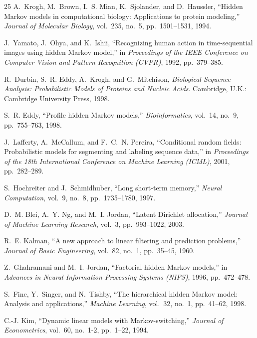 \documentclass[conference]{IEEEtran}
\begin{document}
\begin{thebibliography}{25}
A.~Krogh, M.~Brown, I.~S. Mian, K.~Sjolander, and D.~Haussler,
``Hidden Markov models in computational biology: Applications to protein modeling,''
\emph{Journal of Molecular Biology}, vol.~235, no.~5, pp.~1501--1531, 1994.

J.~Yamato, J.~Ohya, and K.~Ishii,
``Recognizing human action in time-sequential images using hidden Markov model,''
in \emph{Proceedings of the IEEE Conference on Computer Vision and Pattern Recognition (CVPR)}, 1992, pp.~379--385.

R.~Durbin, S.~R. Eddy, A.~Krogh, and G.~Mitchison,
\emph{Biological Sequence Analysis: Probabilistic Models of Proteins and Nucleic Acids}.
Cambridge, U.K.: Cambridge University Press, 1998.

S.~R. Eddy,
``Profile hidden Markov models,''
\emph{Bioinformatics}, vol.~14, no.~9, pp.~755--763, 1998.

J.~Lafferty, A.~McCallum, and F.~C.~N. Pereira,
``Conditional random fields: Probabilistic models for segmenting and labeling sequence data,''
in \emph{Proceedings of the 18th International Conference on Machine Learning (ICML)}, 2001, pp.~282--289.

S.~Hochreiter and J.~Schmidhuber,
``Long short-term memory,''
\emph{Neural Computation}, vol.~9, no.~8, pp.~1735--1780, 1997.

D.~M. Blei, A.~Y. Ng, and M.~I. Jordan,
``Latent Dirichlet allocation,''
\emph{Journal of Machine Learning Research}, vol.~3, pp.~993--1022, 2003.

R.~E. Kalman,
``A new approach to linear filtering and prediction problems,''
\emph{Journal of Basic Engineering}, vol.~82, no.~1, pp.~35--45, 1960.

Z.~Ghahramani and M.~I. Jordan,
``Factorial hidden Markov models,''
in \emph{Advances in Neural Information Processing Systems (NIPS)}, 1996, pp.~472--478.

S.~Fine, Y.~Singer, and N.~Tishby,
``The hierarchical hidden Markov model: Analysis and applications,''
\emph{Machine Learning}, vol.~32, no.~1, pp.~41--62, 1998.

C.-J. Kim,
``Dynamic linear models with Markov-switching,''
\emph{Journal of Econometrics}, vol.~60, no.~1-2, pp.~1--22, 1994.


\end{thebibliography}
\end{document}
